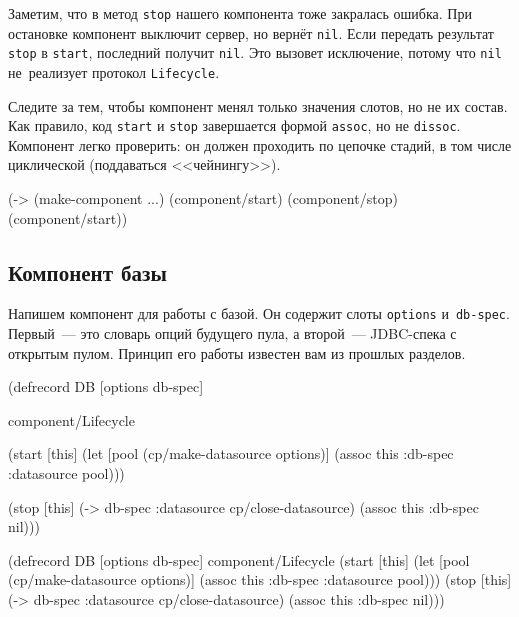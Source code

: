 Заметим, что в метод \verb|stop| нашего компонента тоже закралась ошибка. При
остановке компонент выключит сервер, но вернёт \verb|nil|. Если передать
результат \verb|stop| в \verb|start|, последний получит \verb|nil|. Это вызовет
исключение, потому что \verb|nil| не~реализует протокол \verb|Lifecycle|.


Следите за тем, чтобы компонент менял только значения слотов, но не их
состав. Как правило, код \verb|start| и \verb|stop| завершается формой
\verb|assoc|, но не \verb|dissoc|. Компонент легко проверить: он должен
проходить по цепочке стадий, в том числе циклической (поддаваться <<чейнингу>>).

\begin{english}
  \begin{clojure}
(-> (make-component {...})
    (component/start)
    (component/stop)
    (component/start))
  \end{clojure}
\end{english}


\subsection{Компонент базы}

Напишем компонент для работы с базой. Он содержит слоты \verb|options|
и~\verb|db-spec|. Первый~--- это словарь опций будущего пула, а второй~---
JDBC-спека с открытым пулом. Принцип его работы известен вам из прошлых
разделов.

\ifx\DEVICETYPE\MOBILE

\begin{english}
  \begin{clojure}
(defrecord DB [options db-spec]

  component/Lifecycle

  (start [this]
    (let [pool (cp/make-datasource
                 options)]
      (assoc this :db-spec
        {:datasource pool})))

  (stop [this]
    (-> db-spec
        :datasource
        cp/close-datasource)
    (assoc this :db-spec nil)))
  \end{clojure}
\end{english}

\else

\begin{english}
  \begin{clojure}
(defrecord DB [options db-spec]
  component/Lifecycle
  (start [this]
    (let [pool (cp/make-datasource options)]
      (assoc this :db-spec {:datasource pool})))
  (stop [this]
    (-> db-spec :datasource cp/close-datasource)
    (assoc this :db-spec nil)))
  \end{clojure}
\end{english}

